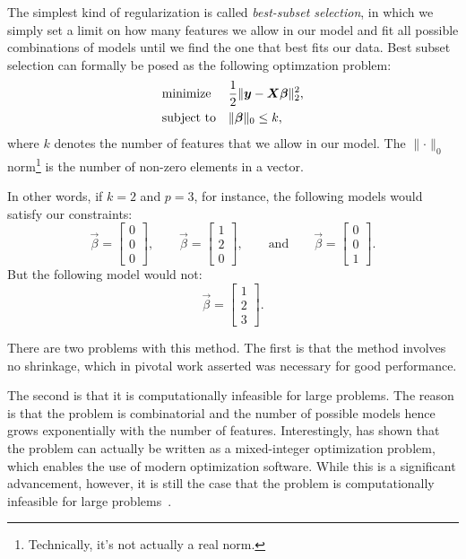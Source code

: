 The simplest kind of regularization is called \emph{best-subset selection}, in which we simply set a limit on how many features we allow in our model and fit all possible combinations of models until we find the one that best fits our data. Best subset selection can formally be posed as the following optimzation problem:
\[
  \begin{aligned}
     & \text{minimize}   &  & \frac{1}{2} \lVert \boldsymbol{y} - \boldsymbol{X}\boldsymbol{\beta}\rVert^2_2, \\
     & \text{subject to} &  & \lVert \boldsymbol{\beta} \rVert_0 \leq k,
  \end{aligned}
\]
where \(k\) denotes the number of features that we allow in our model. The \(\lVert \cdot \rVert_0\) norm\footnote{Technically, it's not actually a real norm.} is the number of non-zero elements in a vector.

In other words, if \(k = 2\) and \(p = 3\), for instance, the following models would satisfy our constraints:
\[
  \vec{\beta} = \begin{bmatrix}0 \\ 0 \\ 0\end{bmatrix},\qquad \vec{\beta} = \begin{bmatrix}1 \\ 2 \\ 0\end{bmatrix},\qquad \text{and} \qquad \vec{\beta} = \begin{bmatrix}0 \\ 0 \\ 1\end{bmatrix}.
\]
But the following model would not:
\[
  \vec{\beta} = \begin{bmatrix}1 \\ 2 \\ 3\end{bmatrix}.
\]


There are two problems with this method. The first is that the method involves no shrinkage, which \textcite{stein1956,james1961} in pivotal work asserted was necessary for good performance.

The second is that it is computationally infeasible for large problems. The reason is that the problem is combinatorial and the number of possible models hence grows exponentially with the number of features. Interestingly, \textcite{bertsimas2016} has shown that the problem can actually be written as a mixed-integer optimization problem, which enables the use of modern optimization software. While this is a significant advancement, however, it is still the case that the problem is computationally infeasible for large problems~\parencite{hastie2020}.

